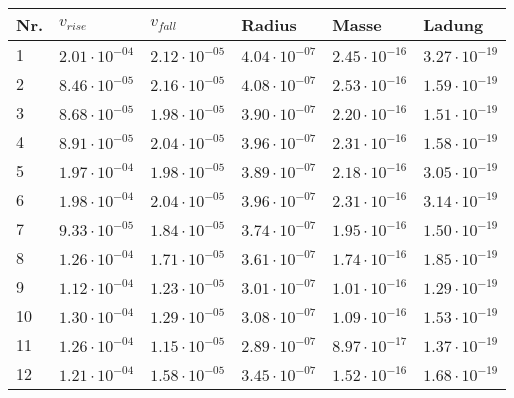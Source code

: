 \newpage
\begin{table}[h]
	\centering
	\begin{tabular}{llllll}
		\toprule
		Nr. & $v_{rise}$ & $v_{fall}$ & Radius & Masse & Ladung \\
		\midrule
		1 &$\mathrm{2.01 \cdot 10^{-04}}$ & $\mathrm{2.12 \cdot 10^{-05}}$ & $\mathrm{4.04 \cdot 10^{-07}}$ & $\mathrm{2.45 \cdot 10^{-16}}$ & $\mathrm{3.27 \cdot 10^{-19}}$ \\
		2 &$\mathrm{8.46 \cdot 10^{-05}}$ & $\mathrm{2.16 \cdot 10^{-05}}$ & $\mathrm{4.08 \cdot 10^{-07}}$ & $\mathrm{2.53 \cdot 10^{-16}}$ & $\mathrm{1.59 \cdot 10^{-19}}$ \\
		3 &$\mathrm{8.68 \cdot 10^{-05}}$ & $\mathrm{1.98 \cdot 10^{-05}}$ & $\mathrm{3.90 \cdot 10^{-07}}$ & $\mathrm{2.20 \cdot 10^{-16}}$ & $\mathrm{1.51 \cdot 10^{-19}}$ \\
		4 &$\mathrm{8.91 \cdot 10^{-05}}$ & $\mathrm{2.04 \cdot 10^{-05}}$ & $\mathrm{3.96 \cdot 10^{-07}}$ & $\mathrm{2.31 \cdot 10^{-16}}$ & $\mathrm{1.58 \cdot 10^{-19}}$ \\
		5 &$\mathrm{1.97 \cdot 10^{-04}}$ & $\mathrm{1.98 \cdot 10^{-05}}$ & $\mathrm{3.89 \cdot 10^{-07}}$ & $\mathrm{2.18 \cdot 10^{-16}}$ & $\mathrm{3.05 \cdot 10^{-19}}$ \\
		6 &$\mathrm{1.98 \cdot 10^{-04}}$ & $\mathrm{2.04 \cdot 10^{-05}}$ & $\mathrm{3.96 \cdot 10^{-07}}$ & $\mathrm{2.31 \cdot 10^{-16}}$ & $\mathrm{3.14 \cdot 10^{-19}}$ \\
		7 &$\mathrm{9.33 \cdot 10^{-05}}$ & $\mathrm{1.84 \cdot 10^{-05}}$ & $\mathrm{3.74 \cdot 10^{-07}}$ & $\mathrm{1.95 \cdot 10^{-16}}$ & $\mathrm{1.50 \cdot 10^{-19}}$ \\
		8 &$\mathrm{1.26 \cdot 10^{-04}}$ & $\mathrm{1.71 \cdot 10^{-05}}$ & $\mathrm{3.61 \cdot 10^{-07}}$ & $\mathrm{1.74 \cdot 10^{-16}}$ & $\mathrm{1.85 \cdot 10^{-19}}$ \\
		9 &$\mathrm{1.12 \cdot 10^{-04}}$ & $\mathrm{1.23 \cdot 10^{-05}}$ & $\mathrm{3.01 \cdot 10^{-07}}$ & $\mathrm{1.01 \cdot 10^{-16}}$ & $\mathrm{1.29 \cdot 10^{-19}}$ \\
		10 &$\mathrm{1.30 \cdot 10^{-04}}$ & $\mathrm{1.29 \cdot 10^{-05}}$ & $\mathrm{3.08 \cdot 10^{-07}}$ & $\mathrm{1.09 \cdot 10^{-16}}$ & $\mathrm{1.53 \cdot 10^{-19}}$ \\
		11 &$\mathrm{1.26 \cdot 10^{-04}}$ & $\mathrm{1.15 \cdot 10^{-05}}$ & $\mathrm{2.89 \cdot 10^{-07}}$ & $\mathrm{8.97 \cdot 10^{-17}}$ & $\mathrm{1.37 \cdot 10^{-19}}$ \\
		12 &$\mathrm{1.21 \cdot 10^{-04}}$ & $\mathrm{1.58 \cdot 10^{-05}}$ & $\mathrm{3.45 \cdot 10^{-07}}$ & $\mathrm{1.52 \cdot 10^{-16}}$ & $\mathrm{1.68 \cdot 10^{-19}}$ \\

\end{tabular}
\end{table}
